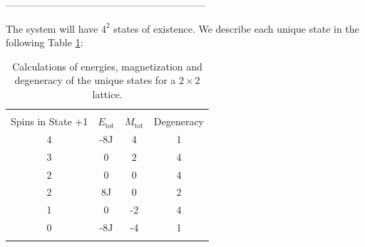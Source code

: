 \documentclass[10pt, nofootinbib, twocolumn]{revtex4-1}
\begin{document}
\begin{center} ------------------------------------------------------------ \end{center}
The system will have $4^2$ states of existence. We describe each unique state in the following Table \ref{tab:states}:
\begin{center}
\begin{table}[h!]

\caption{Calculations of energies, magnetization and degeneracy of the unique states for a $2\times 2$ lattice.}
\begin{tabular*}{0.5\textwidth}{@{\extracolsep{\fill}}cccc}
\toprule
\hline \\
Spins in State +1 & $E_{\text{tot}}$ & $M_{\text{tot}}$ & Degeneracy \\
\midrule
4 & -8J & 4 & 1 \\
3 & 0 & 2 & 4 \\
2 & 0 & 0 & 4 \\
2 & 8J & 0 & 2 \\
1 & 0 & -2 & 4 \\
0 & -8J & -4 & 1 \\ \\
\hline
\bottomrule
\end{tabular*}\label{tab:states}
\end{table}
\end{center}
\end{document}
